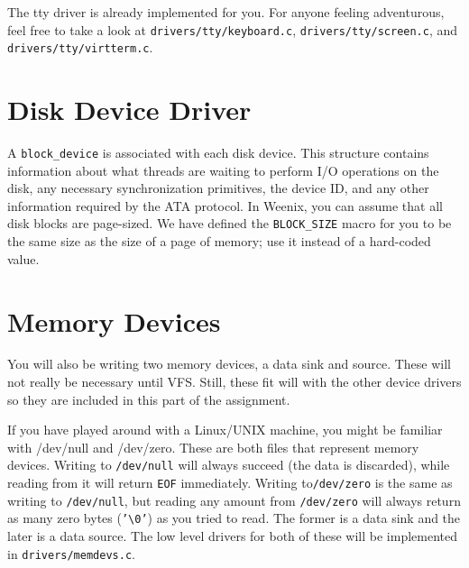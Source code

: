 The tty driver is already implemented for you. For anyone feeling adventurous, feel free to take a look at \texttt{drivers/tty/keyboard.c}, \texttt{drivers/tty/screen.c}, and \texttt{drivers/tty/virtterm.c}. 

\section{Disk Device Driver}
A \texttt{block\_device} is associated with each disk device. This structure contains information about what threads are waiting to perform I/O operations on the disk, any necessary synchronization primitives, the device ID, and any other information required by the ATA protocol. In Weenix, you can assume that all disk blocks are page-sized. We have defined the \texttt{BLOCK\_SIZE} macro for you to be the same size as the size of a page of memory; use it instead of a hard-coded value. 

\section{Memory Devices}
You will also be writing two memory devices, a data sink and source. These will not really be necessary until VFS. Still, these fit will with the other device drivers so they are included in this part of the assignment.

If you have played around with a Linux/UNIX machine, you might be familiar with /dev/null and /dev/zero. These are both files that represent memory devices. Writing to \texttt{/dev/null} will always succeed (the data is discarded), while reading from it will return \texttt{EOF} immediately. Writing to\texttt{/dev/zero} is the same as writing to \texttt{/dev/null}, but reading any amount from \texttt{/dev/zero} will always return as many zero bytes (\texttt{'\textbackslash0'}) as you tried to read. The former is a data sink and the later is a data source. The low level drivers for both of these will be implemented in \texttt{drivers/memdevs.c}. 

